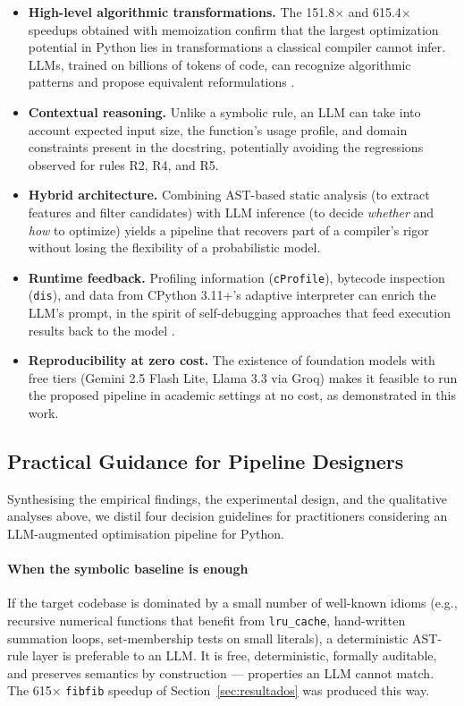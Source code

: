 \documentclass[conference]{IEEEtran}
\begin{document}
\begin{itemize}
  \item \textbf{High-level algorithmic transformations.} The 151.8$\times$ and 615.4$\times$ speedups obtained with memoization confirm that the largest optimization potential in Python lies in transformations a classical compiler cannot infer. LLMs, trained on billions of tokens of code, can recognize algorithmic patterns and propose equivalent reformulations \cite{DBLP:journals/corr/abs-2407-02524,DBLP:journals/corr/abs-2302-07867}.
  \item \textbf{Contextual reasoning.} Unlike a symbolic rule, an LLM can take into account expected input size, the function's usage profile, and domain constraints present in the docstring, potentially avoiding the regressions observed for rules R2, R4, and R5.
  \item \textbf{Hybrid architecture.} Combining AST-based static analysis (to extract features and filter candidates) with LLM inference (to decide \textit{whether} and \textit{how} to optimize) yields a pipeline that recovers part of a compiler's rigor without losing the flexibility of a probabilistic model.
  \item \textbf{Runtime feedback.} Profiling information (\texttt{cProfile}), bytecode inspection (\texttt{dis}), and data from CPython 3.11+'s adaptive interpreter can enrich the LLM's prompt, in the spirit of self-debugging approaches that feed execution results back to the model \cite{DBLP:journals/corr/abs-2304-05128}.
  \item \textbf{Reproducibility at zero cost.} The existence of foundation models with free tiers (Gemini 2.5 Flash Lite, Llama 3.3 via Groq) makes it feasible to run the proposed pipeline in academic settings at no cost, as demonstrated in this work.
\end{itemize}

\subsection{Practical Guidance for Pipeline Designers}
\label{sec:practical_guidance}

Synthesising the empirical findings, the experimental design, and the qualitative analyses above, we distil four decision guidelines for practitioners considering an LLM-augmented optimisation pipeline for Python.

\paragraph{When the symbolic baseline is enough} If the target codebase is dominated by a small number of well-known idioms (e.g., recursive numerical functions that benefit from \texttt{lru\_cache}, hand-written summation loops, set-membership tests on small literals), a deterministic AST-rule layer is preferable to an LLM. It is free, deterministic, formally auditable, and preserves semantics by construction --- properties an LLM cannot match. The 615$\times$ \texttt{fibfib} speedup of Section~\ref{sec:resultados} was produced this way.
\end{document}
